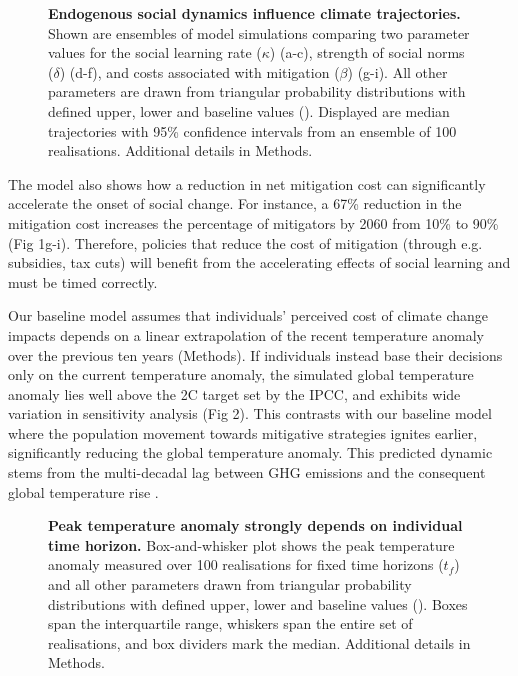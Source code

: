 \documentclass[10pt,letterpaper]{article}
\begin{document}
\begin{figure}[!ht]
\caption{{\bf Endogenous social dynamics influence climate trajectories.}
Shown are
ensembles of model simulations comparing two parameter values for the social learning rate ($\kappa$) (a-c), strength of social norms ($\delta$) (d-f), and costs associated with mitigation ($\beta$)
(g-i). All other parameters are drawn from triangular probability distributions with defined upper, lower and baseline values (). Displayed are median trajectories with 95\% confidence intervals from an ensemble of 100 realisations. Additional details in Methods.}
\label{fig1}
\end{figure}


The model also shows how a reduction in net mitigation cost can significantly accelerate the onset of social change. For instance, a 67\% reduction in the mitigation cost increases the percentage of mitigators by 2060 from 10\% to 90\% (Fig 1g-i). Therefore, policies that reduce the cost of mitigation (through e.g. subsidies, tax cuts) will benefit from the accelerating effects of social learning and must be timed correctly. 

Our baseline model assumes that individuals' perceived cost of climate change impacts depends on a linear extrapolation of the recent temperature anomaly over the previous ten years (Methods). If individuals instead base their decisions only on the current temperature anomaly, the simulated global temperature anomaly lies well above the 2\degree C target set by the IPCC, and exhibits wide variation in sensitivity analysis (Fig 2). This contrasts with our baseline model where the population movement towards mitigative strategies ignites earlier, significantly reducing the global temperature anomaly. This predicted dynamic stems from the multi-decadal lag between GHG emissions and the consequent global temperature rise \cite{hansen05}.

\begin{figure}[!ht]
\caption{{\bf Peak temperature anomaly strongly depends on individual time horizon.}
Box-and-whisker plot shows the peak temperature anomaly measured over 100 realisations for fixed time horizons ($t_f$) and all other parameters drawn from triangular probability distributions with defined upper, lower and baseline values (). Boxes span the interquartile range, whiskers span the entire set of realisations, and box dividers mark the median. Additional details in Methods.}
\label{fig2}
\end{figure}
\end{document}
